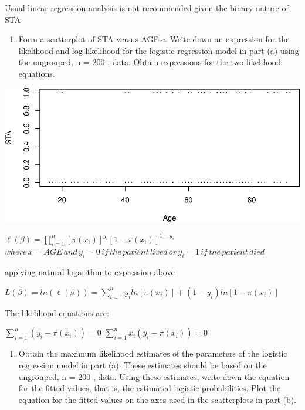 \documentclass[]{article}
\begin{document}
Usual linear regression analysis is not recommended given the binary
nature of STA

\begin{enumerate}
\def\labelenumi{\alph{enumi}.}
\setcounter{enumi}{1}
\itemsep1pt\parskip0pt
\item
  Form a scatterplot of STA versus AGE.c. Write down an expression for
  the likelihood and log likelihood for the logistic regression model in
  part (a) using the ungrouped, n = 200 , data. Obtain expressions for
  the two likelihood equations.
\end{enumerate}

\begin{center}\includegraphics{HomeworkWeek1_files/figure-latex/unnamed-chunk-4-1} \end{center}

$\ell(\beta)=\prod_{i=1}^{n}[\pi(x_i)]^{y_i}[1-\pi(x_i)]^{1-y_i}$\\$where\,x=AGE\,and\,y_i=0\,if\,the\,patient\,lived\,or\,y_i=1\,if\,the\,patient\,died$

applying natural logarithm to expression above

$L(\beta)=ln(\ell(\beta))=\sum_{i=1}^{n}y_iln[\pi(x_i)]+(1-y_i)ln[1-\pi(x_i)]$

The likelihood equations are:

$\sum_{i=1}^{n}(y_i-\pi(x_i))=0$ $\sum_{i=1}^{n}x_i(y_i-\pi(x_i))=0$

\begin{enumerate}
\def\labelenumi{\alph{enumi}.}
\setcounter{enumi}{3}
\itemsep1pt\parskip0pt
\item
  Obtain the maximum likelihood estimates of the parameters of the
  logistic regression model in part (a). These estimates should be based
  on the ungrouped, n = 200 , data. Using these estimates, write down
  the equation for the fitted values, that is, the estimated logistic
  probabilities. Plot the equation for the fitted values on the axes
  used in the scatterplots in part (b).
\end{enumerate}
\end{document}
